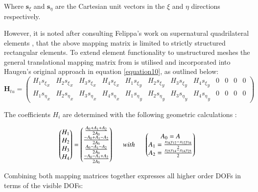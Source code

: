 Where $\mathbf{s}_\xi$ and $\mathbf{s}_\eta$ are the Cartesian unit vectors in the $\xi$ and $\eta$ directions respectively.

However, it is noted after consulting Felippa's work on supernatural quadrilateral elements \cite{felippa2006supernatural}, that the above mapping matrix is limited to strictly structured rectangular elements. To extend element functionality to unstructured meshes the general translational mapping matrix from \cite{felippa2006supernatural} is utilised and incorporated into Haugen's original approach in equation \ref{equation10}, as outlined below:
\begin{equation} 
\mathbf{H}_{tu} =
\begin{pmatrix}
H_1{s_\xi}_x & H_2{s_\xi}_x & H_3{s_\xi}_x & H_4{s_\xi}_x & H_1{s_\xi}_y & H_2{s_\xi}_y & H_3{s_\xi}_y & H_4{s_\xi}_y & 0 & 0 & 0 & 0 \\
H_1{s_\eta}_x & H_2{s_\eta}_x & H_3{s_\eta}_x & H_4{s_\eta}_x & H_1{s_\eta}_y & H_2{s_\eta}_y & H_3{s_\eta}_y & H_4{s_\eta}_y & 0 & 0 & 0 & 0
\end{pmatrix}
\label{equation10_1}
\end{equation}

The coefficients $H_i$ are determined with the following geometric calculations \cite{felippa2006supernatural}:

\begin{equation} 
\begin{pmatrix}
H_1 \\
H_2 \\
H_3 \\
H_4
\end{pmatrix}
=
\begin{pmatrix}
\frac{A_0 + A_1 + A_2}{2A_0} \\
\frac{-A_0 + A_1 - A_2}{2A_0} \\
\frac{A_0 - A_1 - A_2}{2A_0} \\
\frac{-A_0 - A_1 + A_2}{2A_0}
\end{pmatrix}
\hspace{5mm}
with
\hspace{5mm}
\begin{pmatrix}
A_0 = A \\
A_1 = \frac{x_{34} y_{12} - x_{12} y_{34}}{2} \\
A_2 = \frac{x_{23} y_{14} - x_{14} y_{23}}{2}
\end{pmatrix}
\label{equation10_2}
\end{equation}

Combining both mapping matrices together expresses all higher order DOFs in terms of the visible DOFs:

